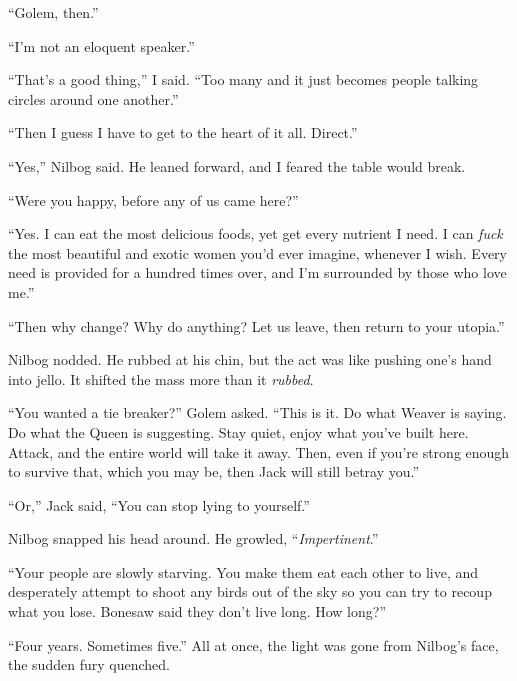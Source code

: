 ``Golem, then.''



``I'm not an eloquent speaker.''



``That's a good thing,'' I said.  ``Too many and it just becomes people talking circles around one another.''



``Then I guess I have to get to the heart of it all.  Direct.''



``Yes,'' Nilbog said.  He leaned forward, and I feared the table would break.



``Were you happy, before any of us came here?''



``Yes.  I can eat the most delicious foods, yet get every nutrient I need.  I can \emph{fuck }the most beautiful and exotic women you'd ever imagine, whenever I wish.  Every need is provided for a hundred times over, and I'm surrounded by those who love me.''



``Then why change?  Why do anything?  Let us leave, then return to your utopia.''



Nilbog nodded.  He rubbed at his chin, but the act was like pushing one's hand into jello.  It shifted the mass more than it \emph{rubbed}.



``You wanted a tie breaker?'' Golem asked.  ``This is it.  Do what Weaver is saying.  Do what the Queen is suggesting.  Stay quiet, enjoy what you've built here.  Attack, and the entire world will take it away.  Then, even if you're strong enough to survive that, which you may be, then Jack will still betray you.''



``Or,'' Jack said, ``You can stop lying to yourself.''



Nilbog snapped his head around.  He growled, ``\emph{Impertinent}.''



``Your people are slowly starving.  You make them eat each other to live, and desperately attempt to shoot any birds out of the sky so you can try to recoup what you lose.  Bonesaw said they don't live long.  How long?''



``Four years.  Sometimes five.''  All at once, the light was gone from Nilbog's face, the sudden fury quenched.



